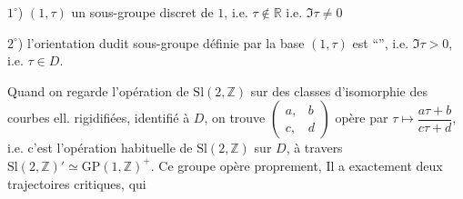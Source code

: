 $1^\circ$) $(1,\tau)$  un sous-groupe discret de  $1$,
i.e. $\tau\notin\mathbb R$ i.e. $\Im\tau\ne0$

$2^\circ$) l'orientation dudit sous-groupe définie par la base $(1,\tau)$ est
``'', i.e. $\Im\tau>0$, i.e. $\tau\in D$.

Quand on regarde l'opération de $\mathrm{Sl}(2,\mathbb Z)$ sur 
des classes d'isomorphie des courbes ell. rigidifiées,  identifié à $D$,
on trouve  $\left(\begin{array}{cc}a,&b\\c,&d\end{array}\right)$ opère par
$\tau\longmapsto\dfrac{a\tau+b}{c\tau+d}$, i.e. c'est l'opération habituelle de
$\mathrm{Sl}(2,\mathbb Z)$ sur $D$, à travers
$\mathrm{Sl}(2,\mathbb Z)'\simeq\mathrm{GP}(1,\mathbb Z)^+$.
Ce groupe opère proprement, Il a exactement deux trajectoires critiques, qui 
